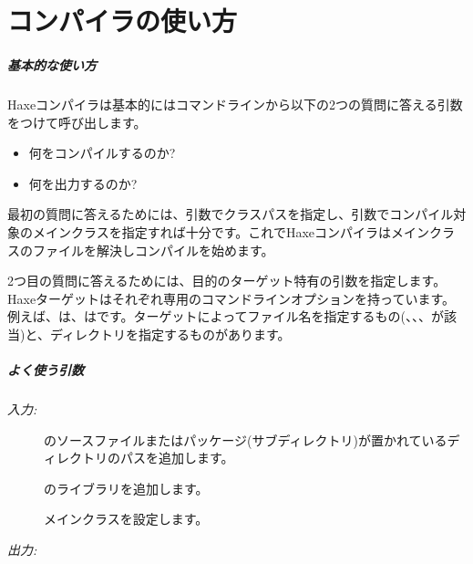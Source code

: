 \chapter{コンパイラの使い方}
\label{compiler-usage}

\paragraph{基本的な使い方}

Haxeコンパイラは基本的にはコマンドラインから以下の2つの質問に答える引数をつけて呼び出します。

\begin{itemize}
	\item 何をコンパイルするのか?
	\item 何を出力するのか?
\end{itemize}

最初の質問に答えるためには、引数でクラスパスを指定し、引数でコンパイル対象のメインクラスを指定すれば十分です。これでHaxeコンパイラはメインクラスのファイルを解決しコンパイルを始めます。

2つ目の質問に答えるためには、目的のターゲット特有の引数を指定します。Haxeターゲットはそれぞれ専用のコマンドラインオプションを持っています。例えば、は、はです。ターゲットによってファイル名を指定するもの(、、、が該当)と、ディレクトリを指定するものがあります。

\paragraph{よく使う引数}

\emph{入力:}

\begin{description}
	\item[] のソースファイルまたはパッケージ(サブディレクトリ)が置かれているディレクトリのパスを追加します。
	\item[] のライブラリを追加します。
	\item[] メインクラスを設定します。
\end{description}

\emph{出力:}

